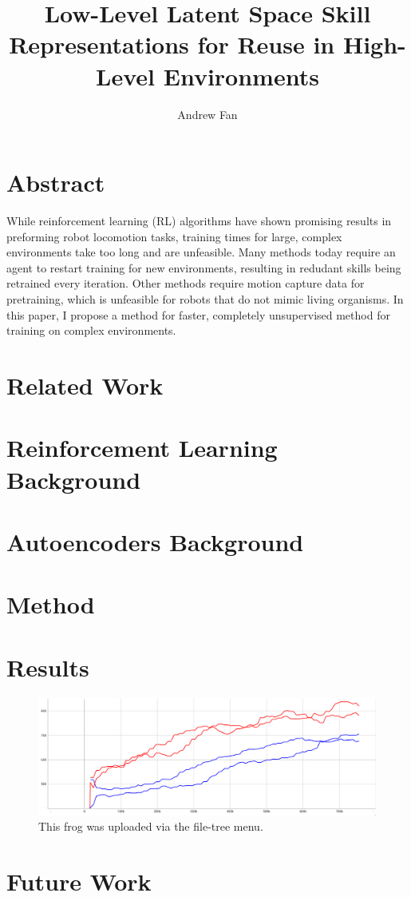 \documentclass[a4paper]{article}
\title{Low-Level Latent Space Skill Representations for Reuse in High-Level Environments}
\author{Andrew Fan}
\begin{document}
\maketitle
\section{Abstract}
While reinforcement learning (RL) algorithms have shown promising results in preforming robot locomotion tasks,
training times for large, complex environments take too long and are unfeasible. Many methods today require 
an agent to restart training for new environments, resulting in redudant skills being retrained every iteration.
Other methods require motion capture data for pretraining, which is unfeasible for robots that do not mimic living organisms.
In this paper, I propose a method for faster, completely unsupervised method for training on complex environments.

\section{Related Work}

\section{Reinforcement Learning Background}
\section{Autoencoders Background}
\section{Method}

\section{Results}
\begin{figure}
\centering
\includegraphics[width=0.25\linewidth]{./figs/obstacle-scratch-vs-autoencoder.png}
\caption{\label{fig:frog}This frog was uploaded via the file-tree menu.}
\end{figure}

\section{Future Work}
\end{document}
